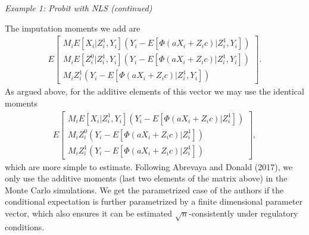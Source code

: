 \documentclass{article}
\theoremstyle{definition}
\theoremstyle{remark}
\begin{document}
\emph{Example 1: Probit with NLS (continued)}

The imputation moments we add are
\begin{align}
E\left[\begin{array}{c}
M_i E[X_i|Z^1_i, Y_i](Y_i-E[\Phi(aX_i+Z_ic)|Z_i^1,Y_i])\\
M_i E[Z_i^0|Z^1_i, Y_i](Y_i-E[\Phi(aX_i+Z_ic)|Z_i^1,Y_i]) \\
M_i Z^1_i(Y_i-E[\Phi(aX_i+Z_ic)|Z_i^1,Y_i])
\end{array}
\right].
\end{align}
As argued above, for the additive elements of this vector we may use the identical moments
\begin{align}
E\left[\begin{array}{c}
M_i E[X_i|Z^1_i, Y_i](Y_i-E[\Phi(aX_i+Z_ic)|Z_i^1])\\
M_i Z_i^0(Y_i-E[\Phi(aX_i+Z_ic)|Z_i^1]) \\
M_i Z^1_i(Y_i-E[\Phi(aX_i+Z_ic)|Z_i^1])
\end{array}
\right],
\end{align}
which are more simple to estimate. Following Abrevaya and Donald (2017), we only use the additive moments (last two elements of the matrix above) in the Monte Carlo simulations. We get the parametrized case of the authors if the conditional expectation is further parametrized by a finite dimensional parameter vector, which also ensures it can be estimated $\sqrt{n}$-consistently under regulatory conditions.
\end{document}

